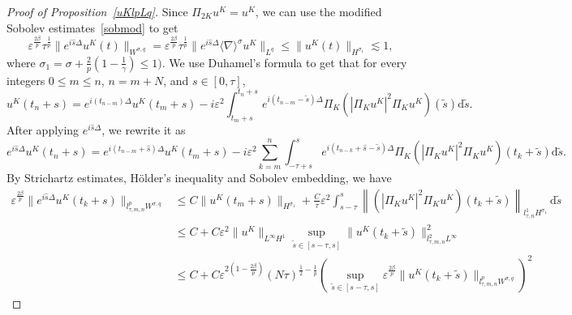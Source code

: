 \documentclass[10pt,a4paper]{article}
\begin{document}
  \begin{proof}[Proof of Proposition~\ref{uKlpLq}]

    Since \(\Pi_{2K} u^K = u^K\), we can use the modified Sobolev
    estimates~\eqref{sobmod} to get 
    \begin{equation}\label{l0usq}
      \varepsilon^{\frac{2\beta}p}\tau^\frac1p \|e^{i\hat s\Delta}u^K(t)\|_{W^{\sigma,q}} = 
      \varepsilon^{\frac{2\beta}p} \tau^\frac1p \|e^{i\hat s\Delta}\langle\nabla\rangle^\sigma u^K\|_{L^q}
      \leq \|u^K(t)\|_{H^{\sigma_1}} \lesssim 1,
    \end{equation}
    where \(\sigma_1 = \sigma + \frac2p(1-\frac1\gamma) \leq 1)\). We use
    Duhamel's formula to get that for every integers \(0 \leq m \leq n \), 
    \(n = m + N\), and \(s \in [0, \tau]\), 
    \[ u^K(t_n+s) = e^{i(t_{n-m})\Delta} u^K(t_m+s) - i\varepsilon^2 
    \int_{t_m+s}^{t_n+s} e^{i(t_{n-m}-\tilde{s})\Delta}\Pi_K
    \left(|\Pi_K u^K|^2 \Pi_K u^K\right) (\tilde{s}) \mathrm{d} \tilde{s}. \]
    After applying \(e^{i\hat s\Delta}\), we rewrite it as 
    \begin{equation}\label{Duhamel}
      e^{i\hat s\Delta}u^K(t_n+s) = e^{i(t_{n-m}+\hat{s})\Delta} u^K(t_m+s) - i\varepsilon^2 
      \sum_{k=m}^{n} \int_{-\tau+s}^{s} e^{i(t_{n-k}+\hat{s}-\tilde{s})\Delta}\Pi_K
      \left(|\Pi_K u^K|^2 \Pi_K u^K\right) (t_k+\tilde{s}) \mathrm{d} \tilde{s}.
    \end{equation}
    By Strichartz estimates, H\"older's inequality and Sobolev embedding, we have 
    \begin{equation}\label{ulpWsq1}
      \begin{aligned}
        \varepsilon^{\frac{2\beta}p}\|e^{i\hat s\Delta}u^K(t_k+s)\|_{l^p_{\tau,m,n}W^{\sigma,q}} 
        & \leq C \|u^K(t_m+s)\|_{H^{\sigma_1}} + \frac{C}\tau
        \varepsilon^2 \int_{s-\tau}^s \left\|\left(|\Pi_K u^K|^2 \Pi_K u^K\right) 
        (t_k+\tilde{s})\right\|_{l^1_{\tau,n}H^{\sigma_1}}\,\mathrm{d}\tilde{s} \\
        & \leq C + C \varepsilon^2 \|u^K\|_{L^\infty H^1} \sup_{\tilde{s} \in [s-\tau,s]} 
        \|u^K(t_k+\tilde{s})\|_{l^2_{\tau,m,n}L^\infty}^2  \\
        & \leq C + C \varepsilon^{2(1-\frac{2\beta}p)} (N\tau)^{\frac12-\frac1p}
        \left( \sup_{\tilde{s} \in [s-\tau,s]} \varepsilon^{\frac{2\beta}p}
        \|u^K(t_k+\tilde{s})\|_{l^p_{\tau,m,n}W^{\sigma,q}}\right)^2 
      \end{aligned}
    \end{equation}

\end{proof}
\end{document}
